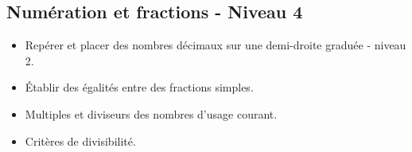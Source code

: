 \documentclass[a4paper,12pt,fleqn]{article}
\begin{document}
\subsection*{Numération et fractions - Niveau 4}

\begin{itemize}
	\item {}Repérer et placer des nombres décimaux sur une demi-droite graduée - niveau 2.
	\item {}Établir des égalités entre des fractions simples.
	\item {}Multiples et diviseurs des nombres d’usage courant.
	\item {}Critères de divisibilité.

\end{itemize}

	
\end{document}
